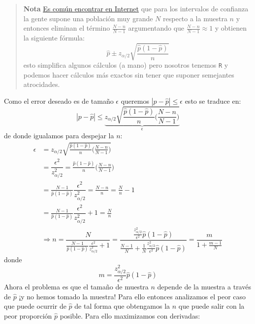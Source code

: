 \documentclass[
]{book}
\begin{document}
\begin{quote}
\textbf{Nota} \href{https://opentextbc.ca/introbusinessstatopenstax/chapter/a-confidence-interval-for-a-population-proportion/}{Es común encontrar en Internet} que para los intervalos de confianza la gente supone una población muy grande \(N\) respecto a la muestra \(n\) y entonces eliminan el término \(\frac{N-n}{N-1}\) argumentando que \(\frac{N-n}{N-1} \approx 1\) y obtienen la siguiente fórmula:
\[
\hat{p} \pm z_{\alpha/2} \sqrt{\frac{\hat{p}(1-\hat{p})}{n}} 
\]
esto simplifica algunos cálculos (a mano) pero nosotros tenemos \texttt{R} y podemos hacer cálculos más exactos sin tener que suponer semejantes atrocidades.
\end{quote}

Como el error deseado es de tamaño \(\epsilon\) queremos \(|p - \hat{p} | \leq \epsilon\) esto se traduce en:
\begin{equation}\nonumber
|p -  \hat{p}| \leq \underbrace{z_{\alpha/2} \sqrt{\frac{\hat{p}(1-\hat{p})}{n} \Big( \frac{N-n}{N-1} \Big) }}_{\epsilon}
\end{equation}
de donde igualamos para despejar la \(n\):
\begin{equation}\nonumber
\begin{aligned}
 \epsilon & = z_{\alpha/2} \sqrt{\frac{\hat{p}(1-\hat{p})}{n}\Big( \frac{N-n}{N-1} \Big)} \\
 & = \dfrac{\epsilon^2 }{z_{\alpha/2}^2} = \frac{\hat{p}(1-\hat{p})}{n}\Big( \frac{N-n}{N-1} \Big) \\
 & = \frac{N-1}{\hat{p}(1-\hat{p})}\dfrac{\epsilon^2 }{z_{\alpha/2}^2} =  \frac{N-n}{n} = \frac{N}{n} - 1 \\
 & = \frac{N-1}{\hat{p}(1-\hat{p})}\dfrac{\epsilon^2 }{z_{\alpha/2}^2} + 1 =  \frac{N}{n} \\
 & \Rightarrow n = \dfrac{N}{\frac{N-1}{\hat{p}(1-\hat{p})}\frac{\epsilon^2 }{z_{\alpha/2}^2} + 1} = \dfrac{\frac{z^2_{\alpha/2}}{\epsilon^2}\hat{p}(1-\hat{p})}{\frac{N-1}{N} + \frac{1}{N}\frac{z^2_{\alpha/2}}{\epsilon^2}\hat{p}(1-\hat{p})} = \dfrac{m}{1 + \frac{m-1}{N}}
\end{aligned}
\end{equation}
donde
\[
m = \frac{z^2_{\alpha/2}}{\epsilon^2}\hat{p}(1-\hat{p})
\]
Ahora el problema es que el tamaño de muestra \(n\) depende de la muestra a través de \(\hat{p}\) ¡y no hemos tomado la muestra! Para ello entonces analizamos el peor caso que puede ocurrir de \(\hat{p}\) de tal forma que obtengamos la \(n\) que puede salir con la peor proporción \(\hat{p}\) posible. Para ello maximizamos con derivadas:
\end{document}
